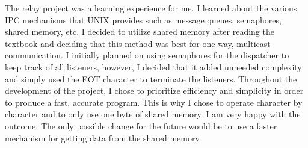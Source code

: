 \documentclass{article}
\begin{document}
The relay project was a learning experience for me. I learned about the
various IPC mechanisms that UNIX provides such as message queues, semaphores,
shared memory, etc. I decided to utilize shared memory after reading the 
textbook and deciding that this method was best for one way, multicast 
communication. I initially planned on using semaphores for the dispatcher to 
keep track of all listeners, however, I decided that it added unneeded 
complexity and simply used the EOT character to terminate the listeners. 
Throughout the development of the project, I chose to prioritize efficiency
and simplicity in order to produce a fast, accurate program. This is why I 
chose to operate character by character and to only use one byte of shared
memory. I am very happy with the outcome. The only possible change for the 
future would be to use a faster mechanism for getting data from the shared 
memory. 
\end{document}

